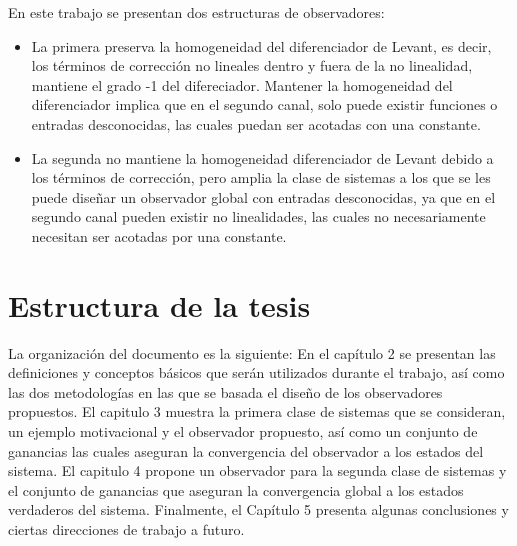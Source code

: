 \documentclass[11pt,letterpaper,twoside,openright]{report}
\begin{document}
	
	En este trabajo se presentan dos estructuras de observadores:
	\begin{itemize}
		\item La primera preserva la homogeneidad del diferenciador de Levant, es decir, los términos de corrección no lineales dentro y fuera  de la no linealidad,  mantiene el grado -1  del difereciador. Mantener la homogeneidad del diferenciador implica que en el segundo canal, solo puede existir funciones o entradas desconocidas, las cuales puedan ser acotadas con una constante.
		
		\item La segunda no mantiene la homogeneidad diferenciador de Levant debido a los  términos de corrección, pero amplia la clase de sistemas a los que se les puede diseñar un observador global con entradas desconocidas, ya que en el segundo canal pueden existir no linealidades, las cuales no necesariamente necesitan ser acotadas por una constante.
	\end{itemize}
	
	\section{Estructura de la tesis}
	
	La organización del documento es la siguiente: En el capítulo 2 se presentan las definiciones y conceptos básicos que serán utilizados durante el trabajo, así como las dos metodologías en las que se basada el diseño de los observadores propuestos. El capitulo 3 muestra la primera clase de sistemas que se consideran, un ejemplo motivacional  y el observador propuesto, así como un conjunto de ganancias las cuales aseguran la convergencia del observador a los estados del sistema. El capitulo 4 propone un observador para la segunda clase de sistemas y el conjunto de ganancias que aseguran la convergencia global a los estados verdaderos del sistema. Finalmente, el Capítulo 5 presenta algunas conclusiones y ciertas direcciones de trabajo a futuro.
	 
	
\end{document}

